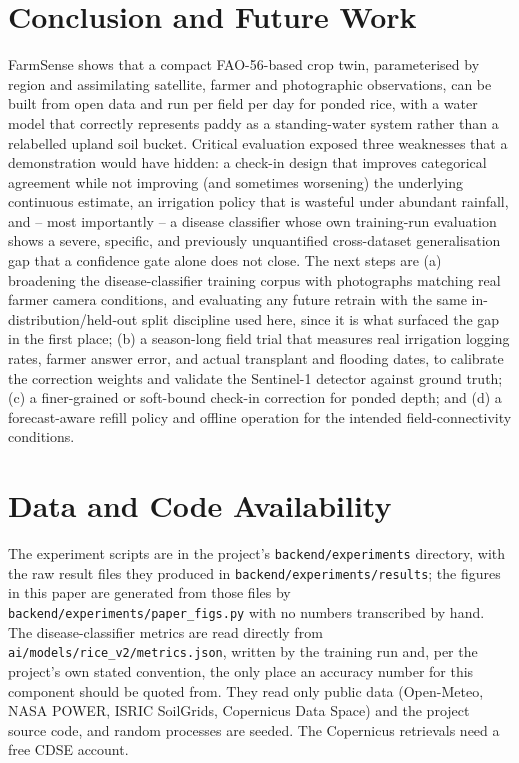 \documentclass[11pt,a4paper]{article}
\begin{document}
\section{Conclusion and Future Work}

FarmSense shows that a compact FAO-56-based crop twin, parameterised by region and assimilating satellite, farmer and photographic observations, can be built from open data and run per field per day for ponded rice, with a water model that correctly represents paddy as a standing-water system rather than a relabelled upland soil bucket. Critical evaluation exposed three weaknesses that a demonstration would have hidden: a check-in design that improves categorical agreement while not improving (and sometimes worsening) the underlying continuous estimate, an irrigation policy that is wasteful under abundant rainfall, and -- most importantly -- a disease classifier whose own training-run evaluation shows a severe, specific, and previously unquantified cross-dataset generalisation gap that a confidence gate alone does not close. The next steps are (a) broadening the disease-classifier training corpus with photographs matching real farmer camera conditions, and evaluating any future retrain with the same in-distribution/held-out split discipline used here, since it is what surfaced the gap in the first place; (b) a season-long field trial that measures real irrigation logging rates, farmer answer error, and actual transplant and flooding dates, to calibrate the correction weights and validate the Sentinel-1 detector against ground truth; (c) a finer-grained or soft-bound check-in correction for ponded depth; and (d) a forecast-aware refill policy and offline operation for the intended field-connectivity conditions.

\section*{Data and Code Availability}

The experiment scripts are in the project's \texttt{backend/experiments} directory, with the raw result files they produced in \texttt{backend/experiments/results}; the figures in this paper are generated from those files by \texttt{backend/experiments/paper\_figs.py} with no numbers transcribed by hand. The disease-classifier metrics are read directly from \texttt{ai/models/rice\_v2/metrics.json}, written by the training run and, per the project's own stated convention, the only place an accuracy number for this component should be quoted from. They read only public data (Open-Meteo, NASA POWER, ISRIC SoilGrids, Copernicus Data Space) and the project source code, and random processes are seeded. The Copernicus retrievals need a free CDSE account.
\end{document}
